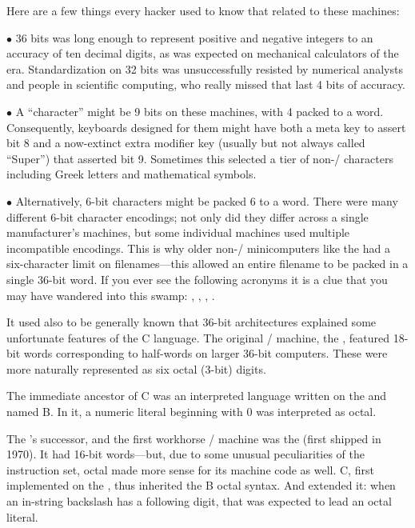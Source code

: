 Here are a few things every hacker used to know that related to these machines:
{\medbreak\narrower
\item{$\bullet$} 36 bits was long enough to represent positive and negative
integers to an accuracy of ten decimal digits, as was expected on mechanical
calculators of the era. Standardization on 32 bits was unsuccessfully resisted
by numerical analysts and people in scientific computing, who really missed
that last 4 bits of accuracy.

\item{$\bullet$} A ``character'' might be 9 bits on these machines, with 4 packed
to a word. Consequently, keyboards designed for them might have both a meta key
to assert bit 8 and a now-extinct extra modifier key (usually but not always
called ``Super'') that asserted bit 9. Sometimes this selected a tier of
non-\ASCII/ characters including Greek letters and mathematical symbols.

\item{$\bullet$} Alternatively, 6-bit characters might be packed 6 to a word.
There were many different 6-bit character encodings; not only did they differ
across a single manufacturer's machines, but some individual machines used
multiple incompatible encodings. This is why older non-\UNIX/ minicomputers like
the  had a six-character limit on filenames---this allowed an entire
filename to be packed in a single 36-bit word. If you ever see the following
acronyms it is a clue that you may have wandered into this swamp: ,
, , .\medbreak}
\noindent It used also to be generally known that 36-bit architectures
explained some unfortunate features of the C language. The original \UNIX/
machine, the , featured 18-bit words corresponding to half-words on larger
36-bit computers. These were more naturally represented as six octal (3-bit)
digits.

The immediate ancestor of C was an interpreted language written on the 
and named B. In it, a numeric literal beginning with 0 was interpreted as
octal.

The 's successor, and the first workhorse \UNIX/ machine was the 
(first shipped in 1970). It had 16-bit words---but, due to some unusual
peculiarities of the instruction set, octal made more sense for its machine
code as well. C, first implemented on the , thus inherited the B octal
syntax. And extended it: when an in-string backslash has a following digit,
that was expected to lead an octal literal.

